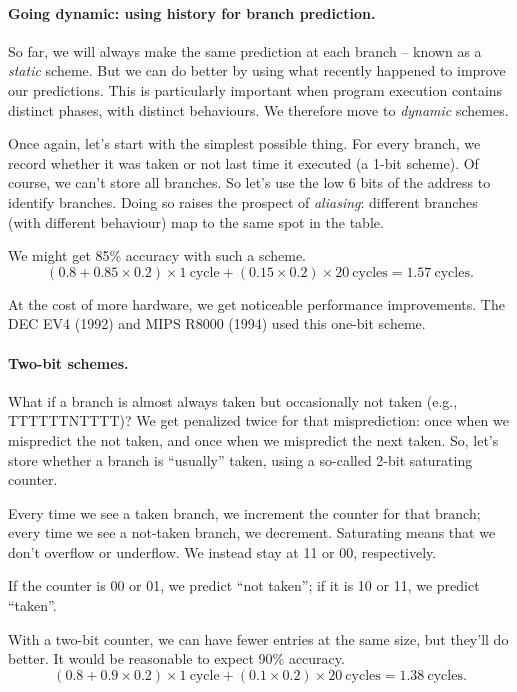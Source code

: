 \paragraph{Going dynamic: using history for branch prediction.}
So far, we will always make the same prediction at each branch -- known as a
\emph{static} scheme. But we can do better by using what recently happened to
improve our predictions. This is particularly important when program execution
contains distinct phases, with distinct behaviours.
We therefore move to \emph{dynamic} schemes.

Once again, let's start with the simplest possible thing. For every branch,
we record whether it was taken or not last time it executed (a 1-bit scheme).
Of course, we can't store all branches. So let's use the low 6 bits of the address
to identify branches. Doing so raises the prospect of \emph{aliasing}:
different branches (with different behaviour) map to the same spot in the table.

We might get 85\% accuracy with such a scheme.
\[
(0.8 + 0.85 \times 0.2) \times 1 \mathrm{~cycle} + (0.15 \times 0.2) \times 20 \mathrm{~cycles} = 1.57 \mathrm{~cycles}.
\]

At the cost of more hardware, we get noticeable performance improvements. The DEC EV4 (1992) and
MIPS R8000 (1994) used this one-bit scheme.

\paragraph{Two-bit schemes.}
What if a branch is almost always taken but occasionally not taken (e.g., TTTTTTNTTTT)?
We get penalized twice
for that misprediction: once when we mispredict the not taken, and once when we mispredict the
next taken. So, let's store whether a branch is ``usually'' taken, using a so-called
2-bit saturating counter.

Every time we see a taken branch, we increment the counter for that
branch; every time we see a not-taken branch, we decrement. Saturating
means that we don't overflow or underflow. We instead stay at 11 or
00, respectively.

If the counter is 00 or 01, we predict ``not taken''; if it is 10 or
11, we predict ``taken''.

With a two-bit counter, we can have fewer entries at the same size, but they'll do better.
It would be reasonable to expect 90\% accuracy.
\[
(0.8 + 0.9 \times 0.2) \times 1 \mathrm{~cycle} + (0.1 \times 0.2) \times 20 \mathrm{~cycles} = 1.38 \mathrm{~cycles}.
\]

